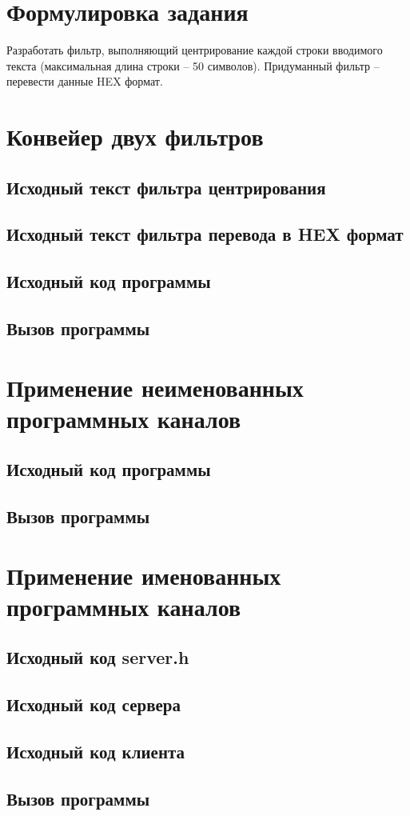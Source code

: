 \documentclass[a4paper,14pt]{article}
\begin{document}


\tableofcontents
\pagebreak

\section{Формулировка задания}
Разработать фильтр, выполняющий центрирование каждой строки вводимого текста (максимальная длина строки – 50 символов).
Придуманный фильтр -- перевести данные HEX формат.

\section{Конвейер двух фильтров}

\subsection{Исходный текст фильтра центрирования}
{\small }
\subsection{Исходный текст фильтра перевода в HEX формат}
{\small }
\subsection{Исходный код программы}
{\small }
\subsection{Вызов программы}
{\small }

\section{Применение неименованных программных каналов}

\subsection{Исходный код программы}
{\small }
\subsection{Вызов программы}
{\small }

\section{Применение именованных программных каналов}

\subsection{Исходный код server.h}
{\small }
\subsection{Исходный код сервера}
{\small }
\subsection{Исходный код клиента}
{\small }
\subsection{Вызов программы}
{\small }
\end{document}
